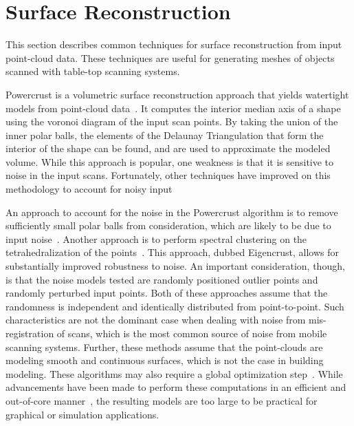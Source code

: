 \documentclass[12pt,onecolumn,oneside]{book}
\begin{document}
\section{Surface Reconstruction}
\label{sec:surf_recon_background}

This section describes common techniques for surface reconstruction from input point-cloud data.  These techniques are useful for generating meshes of objects scanned with table-top scanning systems.

Powercrust is a volumetric surface reconstruction approach that yields watertight models from point-cloud data~\cite{Powercrust}.  It computes the interior median axis of a shape using the voronoi diagram of the input scan points.  By taking the union of the inner polar balls, the elements of the Delaunay Triangulation that form the interior of the shape can be found, and are used to approximate the modeled volume.  While this approach is popular, one weakness is that it is sensitive to noise in the input scans.  Fortunately, other techniques have improved on this methodology to account for noisy input

An approach to account for the noise in the Powercrust algorithm is to remove sufficiently small polar balls from consideration, which are likely to be due to input noise~\cite{NoisyPowercrust}.  Another approach is to perform spectral clustering on the tetrahedralization of the points~\cite{EigencrustShewchuk}.  This approach, dubbed Eigencrust, allows for substantially improved robustness to noise.  An important consideration, though, is that the noise models tested are randomly positioned outlier points and randomly perturbed input points.  Both of these approaches assume that the randomness is independent and identically distributed from point-to-point.  Such characteristics are not the dominant case when dealing with noise from mis-registration of scans, which is the most common source of noise from mobile scanning systems.  Further, these methods assume that the point-clouds are modeling smooth and continuous surfaces, which is not the case in building modeling.  These algorithms may also require a global optimization step~\cite{EigencrustShewchuk}.  While advancements have been made to perform these computations in an efficient and out-of-core manner~\cite{RealTimeEigenCrust,StreamingDelaunay}, the resulting models are too large to be practical for graphical or simulation applications.
\end{document}
